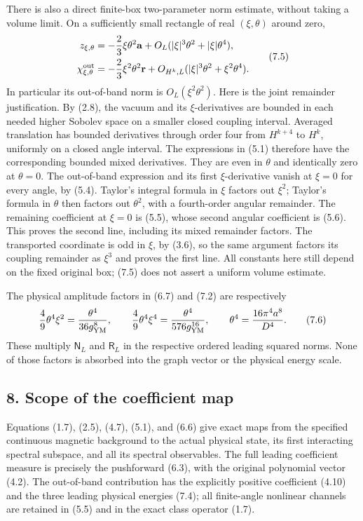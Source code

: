 \documentclass[
  11pt,
]{article}
\begin{document}
There is also a direct finite-box two-parameter norm estimate, without
taking a volume limit. On a sufficiently small rectangle of real
\((\xi,\theta)\) around zero, \[
\begin{split}
 z_{\xi,\theta}
   &=-\frac23\xi\theta^2\mathbf a
      +O_L(|\xi|^3\theta^2+|\xi|\theta^4),\\
 \chi^{\rm out}_{\xi,\theta}
   &=-\frac23\xi^2\theta^2\mathbf r
      +O_{H^k,L}(|\xi|^3\theta^2+\xi^2\theta^4).
\end{split}
\tag{7.5}
\] In particular its out-of-band norm is \(O_L(\xi^2\theta^2)\). Here is
the joint remainder justification. By (2.8), the vacuum and its
\(\xi\)-derivatives are bounded in each needed higher Sobolev space on a
smaller closed coupling interval. Averaged translation has bounded
derivatives through order four from \(H^{k+4}\) to \(H^k\), uniformly on
a closed angle interval. The expressions in (5.1) therefore have the
corresponding bounded mixed derivatives. They are even in \(\theta\) and
identically zero at \(\theta=0\). The out-of-band expression and its
first \(\xi\)-derivative vanish at \(\xi=0\) for every angle, by (5.4).
Taylor's integral formula in \(\xi\) factors out \(\xi^2\); Taylor's
formula in \(\theta\) then factors out \(\theta^2\), with a fourth-order
angular remainder. The remaining coefficient at \(\xi=0\) is (5.5),
whose second angular coefficient is (5.6). This proves the second line,
including its mixed remainder factors. The transported coordinate is odd
in \(\xi\), by (3.6), so the same argument factors its coupling
remainder as \(\xi^3\) and proves the first line. All constants here
still depend on the fixed original box; (7.5) does not assert a uniform
volume estimate.

The physical amplitude factors in (6.7) and (7.2) are respectively \[
 \frac49\theta^4\xi^2=\frac{\theta^4}{36g_{\rm YM}^8},
 \qquad
 \frac49\theta^4\xi^4=\frac{\theta^4}{576g_{\rm YM}^{16}},
 \qquad \theta^4=\frac{16\pi^4a^8}{D^4}.
\tag{7.6}
\] These multiply \(\mathsf N_L\) and \(\mathsf R_L\) in the respective
ordered leading squared norms. None of those factors is absorbed into
the graph vector or the physical energy scale.

\subsection{8. Scope of the coefficient
map}\label{magnetic-part-9-scope-of-the-coefficient-map}

Equations (1.7), (2.5), (4.7), (5.1), and (6.6) give exact maps from the
specified continuous magnetic background to the actual physical state,
its first interacting spectral subspace, and all its spectral
observables. The full leading coefficient measure is precisely the
pushforward (6.3), with the original polynomial vector (4.2). The
out-of-band contribution has the explicitly positive coefficient (4.10)
and the three leading physical energies (7.4); all finite-angle
nonlinear channels are retained in (5.5) and in the exact class operator
(1.7).
\end{document}

